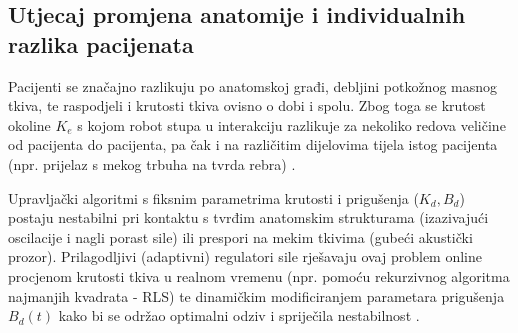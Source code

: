 \subsection{Utjecaj promjena anatomije i individualnih razlika pacijenata}
Pacijenti se značajno razlikuju po anatomskoj građi, debljini potkožnog masnog tkiva, te raspodjeli i krutosti tkiva ovisno o dobi i spolu. Zbog toga se krutost okoline $K_e$ s kojom robot stupa u interakciju razlikuje za nekoliko redova veličine od pacijenta do pacijenta, pa čak i na različitim dijelovima tijela istog pacijenta (npr. prijelaz s mekog trbuha na tvrda rebra) \cite{jiang2024force}. 

Upravljački algoritmi s fiksnim parametrima krutosti i prigušenja ($K_d, B_d$) postaju nestabilni pri kontaktu s tvrđim anatomskim strukturama (izazivajući oscilacije i nagli porast sile) ili prespori na mekim tkivima (gubeći akustički prozor). Prilagodljivi (adaptivni) regulatori sile rješavaju ovaj problem online procjenom krutosti tkiva u realnom vremenu (npr. pomoću rekurzivnog algoritma najmanjih kvadrata - RLS) te dinamičkim modificiranjem parametara prigušenja $B_d(t)$ kako bi se održao optimalni odziv i spriječila nestabilnost \cite{sae2026adaptive, li2026robotic}.

